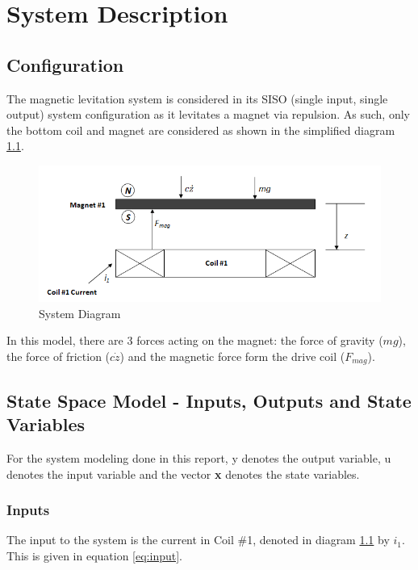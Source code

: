 \chapter{System Description} 


\section{Configuration}
%	


The magnetic levitation system is considered in its SISO (single input, single output) system configuration as it levitates a magnet via repulsion.
As such, only the bottom coil and magnet are considered as shown in the simplified diagram \ref{fig:projSys}.

\begin{figure}[h]
    \centering
    \includegraphics[width=.9\textwidth]{projSys}
    \caption{System Diagram}
    \label{fig:projSys}
\end{figure}

In this model, there are 3 forces acting on the magnet: the force of gravity ($mg$), the force of friction ($c\dot{z}$) and the magnetic force form the drive coil ($F_{mag}$).

\section{State Space Model - Inputs, Outputs and State Variables}

For the system modeling done in this report, y denotes the output variable, u denotes the input variable and the vector \textbf{x} denotes the state variables.

\subsection{Inputs}
The input to the system is the current in Coil \#1, denoted in diagram \ref{fig:projSys} by $i_{1}$.
This is given in equation \ref{eq:input}.


